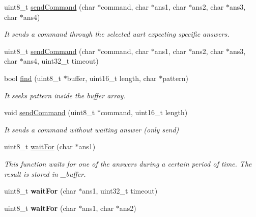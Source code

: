 \begin{DoxyCompactItemize}
\item 
uint8\+\_\+t \hyperlink{class_wasp_u_a_r_t_a0d3c7044158e4a53707150b175e01c86}{send\+Command} (char $\ast$command, char $\ast$ans1, char $\ast$ans2, char $\ast$ans3, char $\ast$ans4)
\begin{DoxyCompactList}\small\item\em It sends a command through the selected uart expecting specific answers. \end{DoxyCompactList}\item 
uint8\+\_\+t \hyperlink{class_wasp_u_a_r_t_abe0ec53249044edcd1c1238abece0773}{send\+Command} (char $\ast$command, char $\ast$ans1, char $\ast$ans2, char $\ast$ans3, char $\ast$ans4, uint32\+\_\+t timeout)
\item 
bool \hyperlink{class_wasp_u_a_r_t_ac04a834eb34ddddc5e7caf475f31ce45}{find} (uint8\+\_\+t $\ast$buffer, uint16\+\_\+t length, char $\ast$pattern)\hypertarget{class_wasp_u_a_r_t_ac04a834eb34ddddc5e7caf475f31ce45}{}\label{class_wasp_u_a_r_t_ac04a834eb34ddddc5e7caf475f31ce45}

\begin{DoxyCompactList}\small\item\em It seeks \textquotesingle{}pattern\textquotesingle{} inside the \textquotesingle{}buffer\textquotesingle{} array. \end{DoxyCompactList}\item 
void \hyperlink{class_wasp_u_a_r_t_a3a42fadafbb0e3ab853e7622bc581e60}{send\+Command} (uint8\+\_\+t $\ast$command, uint16\+\_\+t length)
\begin{DoxyCompactList}\small\item\em It sends a command without waiting answer (only send) \end{DoxyCompactList}\item 
uint8\+\_\+t \hyperlink{class_wasp_u_a_r_t_a7cc3c07c39f984058cae8ac892e7347d}{wait\+For} (char $\ast$ans1)
\begin{DoxyCompactList}\small\item\em This function waits for one of the answers during a certain period of time. The result is stored in \textquotesingle{}\+\_\+buffer\textquotesingle{}. \end{DoxyCompactList}\item 
uint8\+\_\+t {\bfseries wait\+For} (char $\ast$ans1, uint32\+\_\+t timeout)\hypertarget{class_wasp_u_a_r_t_a42e43984989ff61f8c49f477efd7aa7a}{}\label{class_wasp_u_a_r_t_a42e43984989ff61f8c49f477efd7aa7a}

\item 
uint8\+\_\+t {\bfseries wait\+For} (char $\ast$ans1, char $\ast$ans2)\hypertarget{class_wasp_u_a_r_t_a6026dec03a2d7922db82af216d80f5bb}{}\label{class_wasp_u_a_r_t_a6026dec03a2d7922db82af216d80f5bb}


\end{DoxyCompactItemize}
